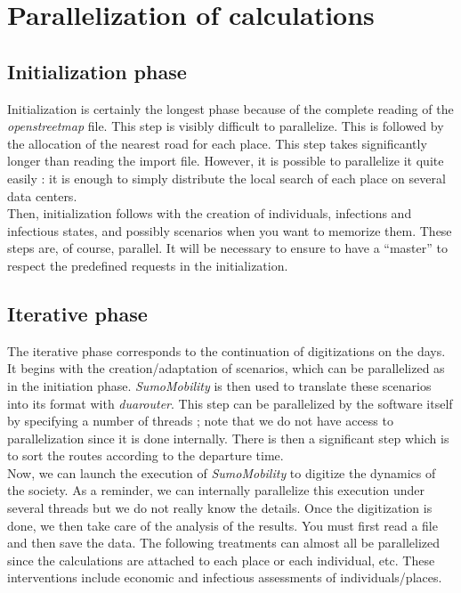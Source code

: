 \chapter{Parallelization of calculations}

\section{Initialization phase}

Initialization is certainly the longest phase because of the complete reading of the \textit{openstreetmap} file. This step is visibly difficult to parallelize. This is followed by the allocation of the nearest road for each place. This step takes significantly longer than reading the import file. However, it is possible to parallelize it quite easily : it is enough to simply distribute the local search of each place on several data centers.\\

Then, initialization follows with the creation of individuals, infections and infectious states, and possibly scenarios when you want to memorize them. These steps are, of course, parallel. It will be necessary to ensure to have a ``master'' to respect the predefined requests in the initialization.\\

\section{Iterative phase}

The iterative phase corresponds to the continuation of digitizations on the days. It begins with the creation/adaptation of scenarios, which can be parallelized as in the initiation phase. \textit{SumoMobility} is then used to translate these scenarios into its format with \textit{duarouter}. This step can be parallelized by the software itself by specifying a number of threads ; note that we do not have access to parallelization since it is done internally. There is then a significant step which is to sort the routes according to the departure time.\\

Now, we can launch the execution of \textit{SumoMobility} to digitize the dynamics of the society. As a reminder, we can internally parallelize this execution under several threads but we do not really know the details. Once the digitization is done, we then take care of the analysis of the results. You must first read a file and then save the data. The following treatments can almost all be parallelized since the calculations are attached to each place or each individual, etc. These interventions include economic and infectious assessments of individuals/places.
